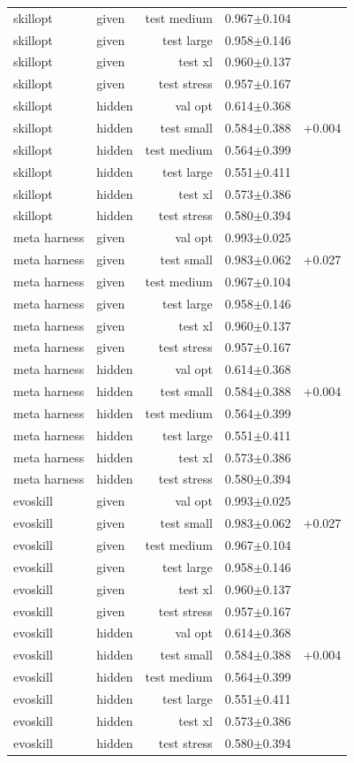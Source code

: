 \begin{tabular}{llrrr}
skillopt & given & test medium & 0.967$\pm$0.104 &  \\
skillopt & given & test large & 0.958$\pm$0.146 &  \\
skillopt & given & test xl & 0.960$\pm$0.137 &  \\
skillopt & given & test stress & 0.957$\pm$0.167 &  \\
skillopt & hidden & val opt & 0.614$\pm$0.368 &  \\
skillopt & hidden & test small & 0.584$\pm$0.388 & +0.004 \\
skillopt & hidden & test medium & 0.564$\pm$0.399 &  \\
skillopt & hidden & test large & 0.551$\pm$0.411 &  \\
skillopt & hidden & test xl & 0.573$\pm$0.386 &  \\
skillopt & hidden & test stress & 0.580$\pm$0.394 &  \\
meta harness & given & val opt & 0.993$\pm$0.025 &  \\
meta harness & given & test small & 0.983$\pm$0.062 & +0.027 \\
meta harness & given & test medium & 0.967$\pm$0.104 &  \\
meta harness & given & test large & 0.958$\pm$0.146 &  \\
meta harness & given & test xl & 0.960$\pm$0.137 &  \\
meta harness & given & test stress & 0.957$\pm$0.167 &  \\
meta harness & hidden & val opt & 0.614$\pm$0.368 &  \\
meta harness & hidden & test small & 0.584$\pm$0.388 & +0.004 \\
meta harness & hidden & test medium & 0.564$\pm$0.399 &  \\
meta harness & hidden & test large & 0.551$\pm$0.411 &  \\
meta harness & hidden & test xl & 0.573$\pm$0.386 &  \\
meta harness & hidden & test stress & 0.580$\pm$0.394 &  \\
evoskill & given & val opt & 0.993$\pm$0.025 &  \\
evoskill & given & test small & 0.983$\pm$0.062 & +0.027 \\
evoskill & given & test medium & 0.967$\pm$0.104 &  \\
evoskill & given & test large & 0.958$\pm$0.146 &  \\
evoskill & given & test xl & 0.960$\pm$0.137 &  \\
evoskill & given & test stress & 0.957$\pm$0.167 &  \\
evoskill & hidden & val opt & 0.614$\pm$0.368 &  \\
evoskill & hidden & test small & 0.584$\pm$0.388 & +0.004 \\
evoskill & hidden & test medium & 0.564$\pm$0.399 &  \\
evoskill & hidden & test large & 0.551$\pm$0.411 &  \\
evoskill & hidden & test xl & 0.573$\pm$0.386 &  \\
evoskill & hidden & test stress & 0.580$\pm$0.394 &  \\
\bottomrule
\end{tabular}
